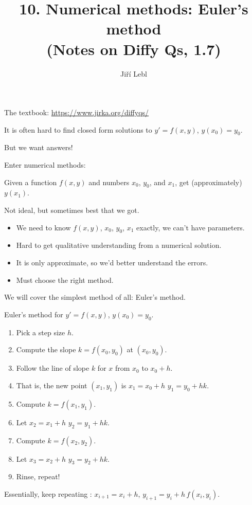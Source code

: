 \documentclass[10pt,aspectratio=169]{beamer}
\author{Ji\v{r}\'i Lebl}
\institute[OSU]{%
Oklahoma State University%
}
\title{10. Numerical methods: Euler's method\\(Notes on Diffy Qs, 1.7)}
\date{}
\begin{document}
\begin{frame}
\titlepage


\begin{center}
The textbook: \url{https://www.jirka.org/diffyqs/}
\end{center}
\end{frame}

\begin{frame}
It is often hard to find closed form solutions to
\quad
$y' = f(x,y)$, \quad $y(x_0) = y_0$.

\medskip
\pause

But we want answers!

\pause
Enter numerical methods:

Given a function $f(x,y)$ and numbers $x_0$, $y_0$, and $x_1$, get (approximately) $y(x_1)$.

\medskip
\pause

Not ideal, but sometimes best that we got.

\begin{itemize}
\item \pause
We need to know $f(x,y)$, $x_0$, $y_0$, $x_1$ exactly, we can't have parameters.
\item \pause
Hard to get qualitative understanding from a numerical solution.
\item \pause
It is only approximate, so we'd better understand the errors.
\item \pause
Must choose the right method.
\end{itemize}

\pause
\medskip

We will cover the simplest method of all: Euler's method.

\end{frame}

\begin{frame}

Euler's method for \quad
$y' = f(x,y)$, \quad $y(x_0) = y_0$.

\begin{enumerate}
\item
\pause
Pick a step size $h$.
\item
\pause
Compute the slope $k = f(x_0,y_0)$ at $(x_0,y_0)$.
\item
\pause
Follow the line of slope $k$ for $x$ from $x_0$ to $x_0+h$.
\item
\pause
That is, the new point $(x_1,y_1)$ is \quad
$x_1 = x_0+h$ \quad $y_1 = y_0 + h k$.
\item
\pause
Compute $k = f(x_1,y_1)$.
\item
\pause
Let $x_2 = x_1+h$ \quad $y_2 = y_1 + h k$.
\item
\pause
Compute $k = f(x_2,y_2)$.
\item
\pause
Let $x_3 = x_2+h$ \quad $y_3 = y_2 + h k$.
\item
\pause
Rinse, repeat!
\end{enumerate}

\pause
Essentially, keep repeating : \quad $x_{i+1} = x_i + h$, \quad $y_{i+1}  = y_i + h\, f(x_i,y_i)$.
\end{frame}
\end{document}
